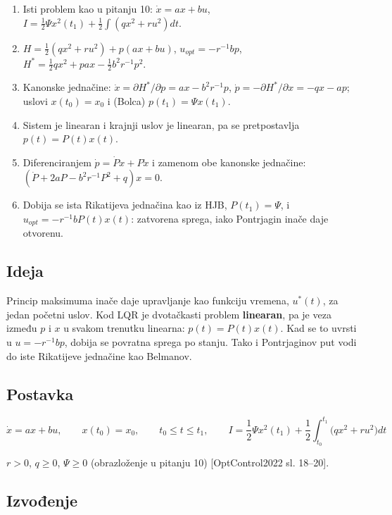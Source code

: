 \documentclass[11pt,a4paper,parskip=half,headsepline,numbers=noenddot]{scrartcl}
\DeclareRobustCommand{\izvor}[1]{{\small\color{izvorC}[#1]}}
\begin{document}
\begin{kljucna}
\begin{enumerate}
\def\labelenumi{\arabic{enumi}.}
\item Isti problem kao u pitanju 10: \(\dot x = ax + bu\), \(I = \frac12\Psi x^2(t_1) + \frac12\int(qx^2 + ru^2)dt\).
\item \(H = \frac12(qx^2 + ru^2) + p(ax + bu)\), \(u_{opt} = -r^{-1}bp\), \(H^* = \frac12qx^2 + pax - \frac12b^2r^{-1}p^2\).
\item Kanonske jednačine: \(\dot x = \partial H^*/\partial p = ax - b^2r^{-1}p\), \(\dot p = -\partial H^*/\partial x = -qx - ap\); uslovi \(x(t_0) = x_0\) i (Bolca) \(p(t_1) = \Psi x(t_1)\).
\item Sistem je linearan i krajnji uslov je linearan, pa se pretpostavlja \(p(t) = P(t)x(t)\).
\item Diferenciranjem \(\dot p = \dot Px + P\dot x\) i zamenom obe kanonske jednačine: \((\dot P + 2aP - b^2r^{-1}P^2 + q)x = 0\).
\item Dobija se ista Rikatijeva jednačina kao iz HJB, \(P(t_1) = \Psi\), i \(u_{opt} = -r^{-1}bP(t)x(t)\): zatvorena sprega, iako Pontrjagin inače daje otvorenu.
\end{enumerate}
\end{kljucna}

\subsection{Ideja}

Princip maksimuma inače daje upravljanje kao funkciju vremena, \(u^*(t)\), za jedan početni uslov. Kod LQR je dvotačkasti problem \textbf{linearan}, pa je veza između \(p\) i \(x\) u svakom trenutku linearna: \(p(t) = P(t)x(t)\). Kad se to uvrsti u \(u = -r^{-1}bp\), dobija se povratna sprega po stanju. Tako i Pontrjaginov put vodi do iste Rikatijeve jednačine kao Belmanov.

\subsection{Postavka}

\[\dot x = ax + bu, \qquad x(t_0) = x_0, \qquad t_0 \le t \le t_1, \qquad I = \frac12\Psi x^2(t_1) + \frac12\int_{t_0}^{t_1}\big(qx^2 + ru^2\big)dt\]

\(r > 0\), \(q \ge 0\), \(\Psi \ge 0\) (obrazloženje u pitanju 10) \izvor{OptControl2022 sl. 18--20}.

\subsection{Izvođenje}
\end{document}
